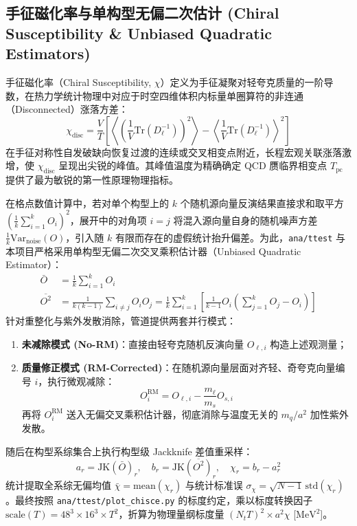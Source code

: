 \documentclass[11pt,a4paper]{ctexart}
\begin{document}
\subsection{\texorpdfstring{手征磁化率与单构型无偏二次估计 (Chiral Susceptibility \& Unbiased Quadratic Estimators)}{手征磁化率与单构型无偏二次估计}}

手征磁化率（Chiral Susceptibility, $\chi$）定义为手征凝聚对轻夸克质量的一阶导数，在热力学统计物理中对应于时空四维体积内标量单圈算符的非连通（Disconnected）涨落方差：
\begin{equation}
\chi_{\text{disc}} = \frac{V}{T} \left[ \left\langle \left( \frac{1}{V} \text{Tr}(D_\ell^{-1}) \right)^2 \right\rangle - \left\langle \frac{1}{V} \text{Tr}(D_\ell^{-1}) \right\rangle^2 \right]
\end{equation}
在手征对称性自发破缺向恢复过渡的连续或交叉相变点附近，长程宏观关联涨落激增，使 $\chi_{\text{disc}}$ 呈现出尖锐的峰值。其峰值温度为精确确定 QCD 赝临界相变点 $T_{\text{pc}}$ 提供了最为敏锐的第一性原理物理指标。

在格点数值计算中，若对单个构型上的 $k$ 个随机源向量反演结果直接求和取平方 $(\frac{1}{k}\sum_{i=1}^k O_i)^2$，展开中的对角项 $i=j$ 将混入源向量自身的随机噪声方差 $\frac{1}{k} \text{Var}_{\text{noise}}(O)$，引入随 $k$ 有限而存在的虚假统计抬升偏差。为此，\texttt{ana/ttest} 与本项目严格采用单构型无偏二次交叉乘积估计器（Unbiased Quadratic Estimator）：
\begin{align}
\bar{O} &= \frac{1}{k} \sum_{i=1}^k O_i \\
\overline{O^2} &= \frac{1}{k(k-1)} \sum_{i \neq j} O_i O_j = \frac{1}{k} \sum_{i=1}^k \left[ \frac{1}{k-1} O_i \left( \sum_{j=1}^k O_j - O_i \right) \right]
\end{align}
针对重整化与紫外发散消除，管道提供两套并行模式：
\begin{enumerate}
    \item \textbf{未减除模式 (No-RM)}：直接由轻夸克随机反演向量 $O_{\ell, i}$ 构造上述观测量；
    \item \textbf{质量修正模式 (RM-Corrected)}：在随机源向量层面对齐轻、奇夸克向量编号 $i$，执行微观减除：
    \begin{equation}
    O_i^{\text{RM}} = O_{\ell, i} - \frac{m_\ell}{m_s} O_{s, i}
    \end{equation}
    再将 $O_i^{\text{RM}}$ 送入无偏交叉乘积估计器，彻底消除与温度无关的 $m_q / a^2$ 加性紫外发散。
\end{enumerate}
随后在构型系综集合上执行构型级 Jackknife 差值重采样：
\begin{equation}
a_r = \text{JK}(\bar{O})_r, \quad b_r = \text{JK}(\overline{O^2})_r, \quad \chi_r = b_r - a_r^2
\end{equation}
统计提取全系综无偏均值 $\bar{\chi} = \text{mean}(\chi_r)$ 与统计标准误 $\sigma_\chi = \sqrt{N-1} \, \text{std}(\chi_r)$。最终按照 \texttt{ana/ttest/plot\_chisce.py} 的标度约定，乘以标度转换因子 $\text{scale}(T) = 48^3 \times 16^3 \times T^2$，折算为物理量纲标度量 $(N_t T)^2 \times a^2\chi$ [$\text{MeV}^2$]。
\end{document}
